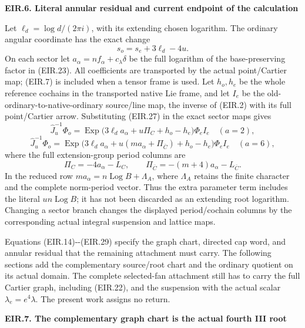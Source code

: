 \par

\medskip\noindent\textbf{EIR.6. Literal annular residual and current endpoint of the calculation}

\par\nobreak

Let \(\ell_d=\log d/(2\pi i)\), with its extending chosen logarithm.
The ordinary angular coordinate has the exact change
\[
 s_o=s_e+3\ell_d-4u.
 \tag{EIR.27}
\]
On each sector let \(a_\alpha=n f_\alpha+c_\lambda\delta\)
be the full logarithm of the base-preserving factor in (EIR.23).
All coefficients are transported by the actual point/Cartier map;
(EIR.7) is included when a tensor frame is used. Let \(h_o,h_e\)
be the whole reference cochains in the transported native Lie frame, and
let \(I_e\) be the old-ordinary-to-native-ordinary source/line map,
the inverse of (EIR.2) with its full point/Cartier arrow. Substituting (EIR.27) in the exact sector maps
gives
\[
 \widehat J_u^{-1}\Phi_o=
 \operatorname{Exp}\bigl(3\ell_d a_\alpha
       +u\Pi_C+h_o-h_e\bigr)\Phi_e I_e\quad(a=2),
\]
\[
 \widehat J_u^{-1}\Phi_o=
 \operatorname{Exp}\bigl(3\ell_d a_\alpha
       +u(m a_\alpha+\Pi_{\overline C})+h_o-h_e\bigr)
                       \Phi_e I_e\quad(a=6),
 \tag{EIR.28}
\]
where the full extension-group period columns are
\[
 \Pi_C=-4a_\alpha-L_C,\qquad
 \Pi_{\overline C}=-(m+4)a_\alpha-L_{\overline C}.
 \tag{EIR.29}
\]
In the reduced row \(m a_\alpha=n\operatorname{Log}B+\Lambda_A\),
where \(\Lambda_A\) retains the finite character and the complete
norm-period vector. Thus the extra parameter term includes the
literal \(un\operatorname{Log}B\); it has not been discarded as
an extending root logarithm. Changing a sector branch changes
the displayed period/cochain columns by the corresponding actual
integral suspension and lattice maps.

Equations (EIR.14)-\/-(EIR.29) specify the graph chart, directed cap
word, and annular residual that the remaining attachment must
carry. The following sections add the complementary source/root chart
and the ordinary quotient on its actual domain. The complete
selected-fan attachment still has to carry the full Cartier graph,
including (EIR.22), and the suspension with the actual scalar
\(\lambda_e=e^4\lambda\). The present work assigns no return.

\par

\medskip\noindent\textbf{EIR.7. The complementary graph chart is the actual fourth III root}

